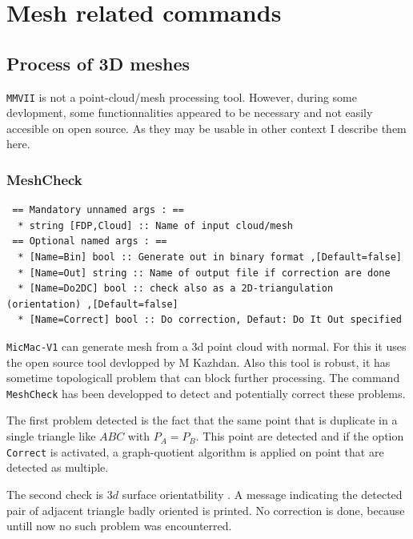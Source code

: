 \chapter{Mesh related commands}



\section{Process of 3D meshes}

 {\tt MMVII} is not a point-cloud/mesh processing tool. However, during some devlopment, some
functionnalities appeared to be necessary and not easily accesible on open source.
As they may be usable in other context I describe them here.

\subsection{MeshCheck}

\begin{verbatim}
 == Mandatory unnamed args : ==
  * string [FDP,Cloud] :: Name of input cloud/mesh
 == Optional named args : ==
  * [Name=Bin] bool :: Generate out in binary format ,[Default=false]
  * [Name=Out] string :: Name of output file if correction are done
  * [Name=Do2DC] bool :: check also as a 2D-triangulation (orientation) ,[Default=false]
  * [Name=Correct] bool :: Do correction, Defaut: Do It Out specified
\end{verbatim}

{\tt MicMac-V1} can generate mesh from a 3d point cloud with normal. For this it
uses the open source tool devlopped by M Kazhdan. Also this tool is robust,
it has sometime topologicall problem that can block further processing.
The command {\tt MeshCheck} has been developped to  detect and potentially
correct these problems.

The first problem detected   is the fact that the same point that is duplicate in
a single triangle  like $ABC$  with $P_A=P_B$. This point are detected and
if the option {\tt Correct} is activated, a graph-quotient algorithm is applied 
on point that are detected as multiple.

The second check is $3d$ surface orientatbility . A message indicating the detected
pair of adjacent triangle badly oriented is printed.  No correction is
done, because untill now no such problem was encounterred.

